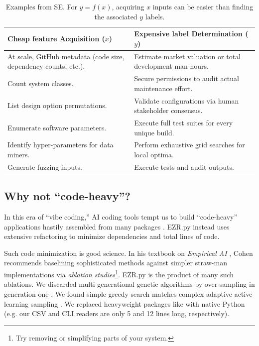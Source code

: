\begin{table}[!t]
\caption{Examples from  SE. For $y=f(x)$,  acquiring $x$ inputs can be  
easier than finding the associated $y$ labels.}
\label{slow}
\begin{center}
{\footnotesize
\begin{tabular}{p{}|p{}}
\rowcolor{gray!20} Cheap feature Acquisition ($x$)  & Expensive label Determination ($y$)\\\hline
At scale, GitHub metadata (code size, dependency counts, etc.). & 
Estimate market valuation or total development man-hours.\\
\rowcolor{gray!10} Count system classes. & 
Secure permissions to audit actual maintenance effort.\\
List design option permutations. & 
Validate configurations via human stakeholder consensus.\\
\rowcolor{gray!10} Enumerate software parameters. & 
Execute full test suites for every unique build.\\
Identify hyper-parameters for data miners. & 
Perform exhaustive grid searches for local optima.\\
\rowcolor{gray!10} Generate fuzzing inputs. & 
Execute tests and audit outputs.\\
\end{tabular}}
\end{center}
\end{table}

\subsection{Why not ``code-heavy''?}
In this era of ``vibe coding,'' AI coding tools tempt us to build ``code-heavy'' applications hastily assembled from many packages . EZR.py instead uses extensive refactoring to minimize dependencies and total lines of code.

Such code minimization is good science. 
In his textbook on {\em Empirical AI}  \cite{cohen1995}, Cohen recommends baselining sophisticated methods against simpler straw-man implementations via {\em ablation studies}\footnote{Try removing or simplifying   parts of your system.}. EZR.py is the product of many  such ablations. We discarded multi-generational genetic algorithms by over-sampling in generation one \cite{nair2016accidental,chen18}. We found simple greedy search matches complex adaptive active learning sampling \cite{ganguly2025lowgodatalightse}. We replaced heavyweight packages like  with native Python (e.g.  our CSV and CLI readers are only 5 and 12 lines long, respectively).

